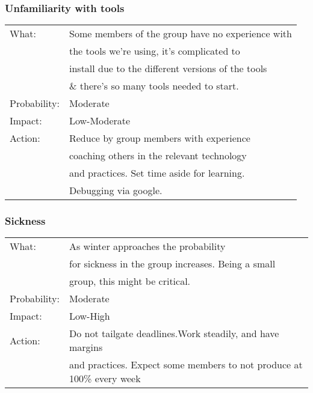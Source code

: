 \subsubsection{Unfamiliarity with tools}
\begin{tabular}{| l | l |}
	\hline
	What: & Some members of the group have no experience with\\
	& the tools we're using, it's complicated to\\
	& install due to the different versions of the tools \\
	& \& there's so many tools needed to start.\\
	\hline
	Probability: & Moderate \\
	\hline
	Impact: & Low-Moderate \\
	\hline
	Action: & Reduce by group members with experience \\
	& coaching others in the relevant technology\\
	& and practices. Set time aside for learning.\\
	& Debugging via google.\\
	\hline

\end{tabular}




\subsubsection{Sickness}
\begin{tabular}{| l | l |}
	\hline
	What: & As winter approaches the probability\\ 	&for sickness in the group increases. Being a small\\ 	&group, this might be critical.\\
	\hline
	Probability: & Moderate \\
	\hline
	Impact: & Low-High \\
	\hline
	Action: & Do not tailgate deadlines.Work steadily, and have margins\\
	&and practices. Expect some members to not produce at 100\% every week\\
	\hline

\end{tabular}

